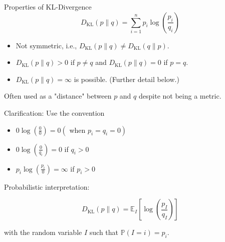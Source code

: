 \begin{frame}[allowframebreaks]

\begin{mytheoremblock}{3.11}{Properties of KL-Divergence}
    $$
    D_{\mathrm{KL}}(p \| q)=\sum_{i=1}^{n} p_{i} \log \left(\frac{p_{i}}{q_{i}}\right)
    $$

    \begin{itemize}
        \item Not symmetric, i.e., $D_{\mathrm{KL}}(p \| q) \neq D_{\mathrm{KL}}(q \| p)$.
        \item $D_{\mathrm{KL}}(p \| q)>0$ if $p \neq q$ and $D_{\mathrm{KL}}(p \| q)=0$ if $p=q$.
        \item $D_{\mathrm{KL}}(p \| q)=\infty$ is possible. (Further detail below.)
    \end{itemize}

    Often used as a "distance" between $p$ and $q$ despite not being a metric.

    \par\noindent\textcolor{gray}{\hdashrule{\textwidth}{0.4pt}{1pt 2pt}}

    Clarification: Use the convention

    \begin{itemize}
        \item $0 \log \left(\frac{0}{0}\right)=0\left(\right.$ when $\left.p_{i}=q_{i}=0\right)$
        \item $0 \log \left(\frac{0}{q_{i}}\right)=0$ if $q_{i}>0$
        \item $p_{i} \log \left(\frac{p_{i}}{0}\right)=\infty$ if $p_{i}>0$
    \end{itemize}

    \par\noindent\textcolor{gray}{\hdashrule{\textwidth}{0.4pt}{1pt 2pt}}

    Probabilistic interpretation:

    $$
    D_{\mathrm{KL}}(p \| q)=\mathbb{E}_{I}\left[\log \left(\frac{p_{I}}{q_{I}}\right)\right]
    $$

    with the random variable $I$ such that $\mathbb{P}(I=i)=p_{i}$.
\end{mytheoremblock}

\end{frame}

